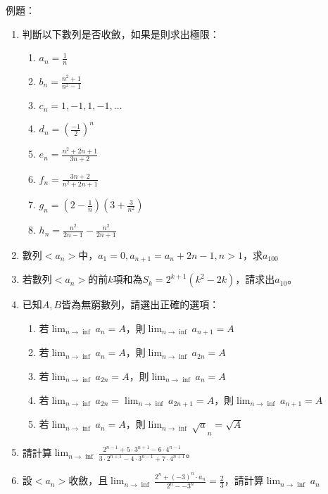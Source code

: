 \documentclass[12pt]{article}
\begin{document}
例題：
\begin{enumerate}
    \item 判斷以下數列是否收斂，如果是則求出極限：
    \begin{enumerate}
        \item $a_n = \frac{1}{n}$\vspace{0.7cm}
        \item $b_n = \frac{n^2 + 1}{n^2 - 1}$\vspace{0.7cm}
        \item $c_n = 1, -1, 1, -1, \ldots$\vspace{0.7cm}
        \item $d_n = \left(\frac{-1}{2}\right)^n$\vspace{0.7cm}
        \item $e_n = \frac{n^2 + 2n + 1}{3n + 2}$\vspace{0.7cm}
        \item $f_n = \frac{3n+2}{n^2 + 2n + 1}$\vspace{0.7cm}
        \item $g_n = \left(2-\frac{1}{n}\right)\left(3+\frac{3}{n^2}\right)$\vspace{0.7cm}
        \item $h_n = \frac{n^2}{2n-1}-\frac{n^2}{2n+1}$\vspace{0.7cm}
    \end{enumerate}
    \item 數列$<a_n>$中，$a_1=0, a_{n+1}=a_n+2n-1, n> 1$，求$a_{100}$\vspace{2cm}
    \item 若數列$<a_n>$的前$k$項和為$S_k = 2^{k+1}(k^2-2k)$，請求出$a_{10}$。\vspace{2cm}
    \item 已知$A, B$皆為無窮數列，請選出正確的選項：
    \begin{enumerate}
        \item 若$\displaystyle\lim_{n\to \inf}a_n=A$，則$\displaystyle\lim_{n\to \inf}a_{n+1}=A$
        \item 若$\displaystyle\lim_{n\to \inf}a_n=A$，則$\displaystyle\lim_{n\to \inf}a_{2n}=A$
        \item 若$\displaystyle\lim_{n\to \inf}a_{2n}=A$，則$\displaystyle\lim_{n\to \inf}a_{n}=A$
        \item 若$\displaystyle\lim_{n\to \inf}a_{2n}=\displaystyle\lim_{n\to \inf}a_{2n+1}=A$，則$\displaystyle\lim_{n\to \inf}a_{n+1}=A$
        \item 若$\displaystyle\lim_{n\to \inf}a_n=A$，則$\displaystyle\lim_{n\to \inf}\sqrt a_{n}=\sqrt A$
    \end{enumerate}
    \item 請計算$\displaystyle\lim_{n\to\inf}\frac{2^{n-1}+5\cdot 3^{n+1}-6\cdot 4^{n-1}}{3\cdot 2^{n+1}-4\cdot 3^{n-1}+7\cdot 4^{n+1}}$。\vspace{2cm}

    \item 設$<a_n>$收斂，且$\displaystyle\lim_{n\to \inf}\frac{2^n+(-3)^n\cdot a_n}{2^n-{-3}^n}=\frac{2}{3}$，請計算$\displaystyle\lim_{n\to\inf}a_n$

\end{enumerate}
\end{document}
